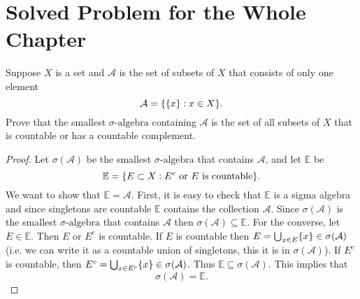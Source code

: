\section{Solved Problem for the Whole Chapter}

\begin{problem}
	Suppose $ X $ is a set and $ \mathcal{A} $ is the set of subsets of $ X $ that consists of only one element 
	\[ \mathcal{A} = \{\{x\}: x \in X\}. \]
	Prove that the smallest $ \sigma\text{-algebra} $ containing $ \mathcal{A} $ is the set of all subsets of $ X $ that is countable or has a countable complement.
\end{problem}
\begin{proof}
	Let $ \sigma(\mathcal{A}) $ be the smallest $ \sigma\text{-algebra} $ that contains $ \mathcal{A} $, and let $ \mathbb{E} $ be
	\[ \mathbb{E} = \{E \subset X: E^c \text{ or } E \text{ is countable}\}. \]
	We want to show that $ \mathbb{E} = \mathcal{A} $.
	First, it is easy to check that $ \mathbb{E} $ is a sigma algebra and since singletons are countable $ \mathbb{E} $ contains the collection $ \mathcal{A} $. Since $ \sigma(\mathcal{A}) $ is the smallest $ \sigma\text{-algebra} $ that contains $ \mathcal{A} $ then $ \sigma(\mathcal{A}) \subseteq \mathbb{E} $. For the converse, let $ E \in \mathbb{E} $. Then $ E $ or $ E^c $ is countable. If $ E $ is countable then $ E = \bigcup_{x\in E}\{x\} \in \sigma(\mathcal{A}) $ (i.e. we can write it as a countable union of singletons, this it is in $ \sigma(\mathcal{A}) $). If $ E^c $ is countable, then $ E^c = \bigcup_{x\in E^c}\{x\} \in \sigma(\mathcal{A}) $. Thus $ \mathbb{E} \subseteq \sigma(\mathcal{A}) $. This implies that 
	\[ \sigma(\mathcal{A}) = \mathbb{E}. \]
\end{proof}